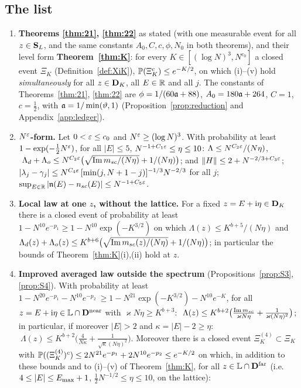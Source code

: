 \subsection{The list}\label{sec:exportlist}
\begin{enumerate}[label=\textbf{(X\arabic*)},leftmargin=3em,itemsep=3pt]
\item \textbf{Theorems \ref{thm:21}, \ref{thm:22}} as stated (with one measurable event for all $z\in\mathbf{S}_L$, and the same constants $A_0,C,c,\phi,N_0$ in both theorems), and their level form \textbf{Theorem~\ref{thm:K}}: for every $K\in[(\log N)^3,N^{c_0}]$ a closed event $\Xi_K$ (Definition~\ref{def:XiK}), $\mathbb{P}(\Xi_K^c)\le e^{-K/2}$, on which (i)--(v) hold \emph{simultaneously} for all $z\in\mathbf{D}_K$, all $E\in\mathbb{R}$ and all $j$.
The constants of Theorems~\ref{thm:21}, \ref{thm:22} are $\phi=1/(60\mathfrak{a}+88)$, $A_0=180\mathfrak{a}+264$, $C=1$, $c=\frac12$, with $\mathfrak{a}=1/\min(\vartheta,1)$ (Proposition~\ref{prop:reduction} and Appendix~\ref{app:ledger}).
\item \textbf{$N^{\varepsilon}$-form.} Let $0<\varepsilon\le c_0$ and $N^\varepsilon\ge(\log N)^3$. With probability at least $1-\exp(-\frac12N^\varepsilon)$, for all $|E|\le5$, $N^{-1+C_1\varepsilon}\le\eta\le10$:
$\Lambda\le N^{C_2\varepsilon}/(N\eta)$, $\ \Lambda_d+\Lambda_o\le N^{C_2\varepsilon}\big(\sqrt{\operatorname{Im}m_{sc}/(N\eta)}+1/(N\eta)\big)$; and $\|H\|\le2+N^{-2/3+C_3\varepsilon}$; $|\lambda_j-\gamma_j|\le N^{C_4\varepsilon}\,[\min(j,N+1-j)]^{-1/3}N^{-2/3}$ for all $j$; $\sup_{E\in\mathbb{R}}|\mathfrak{n}(E)-n_{sc}(E)|\le N^{-1+C_5\varepsilon}$.
\item \textbf{Local law at one $z$, without the lattice.} For a fixed $z=E+\mathrm{i}\eta\in\mathbf{D}_K$ there is a closed event of probability at least $1-N^{10}e^{-p_1}\ge1-N^{10}\exp(-K^{3/2})$ on which
$\Lambda(z)\le K^{b+5}/(N\eta)$ and $\Lambda_d(z)+\Lambda_o(z)\le K^{b+6}\big(\sqrt{\operatorname{Im}m_{sc}(z)/(N\eta)}+1/(N\eta)\big)$; in particular the bounds of Theorem~\ref{thm:K}(i),(ii) hold at $z$.
\item \textbf{Improved averaged law outside the spectrum} (Propositions~\ref{prop:S3}, \ref{prop:S4}). With probability at least $1-N^{20}e^{-p_1}-N^{10}e^{-p_2}\ \ge1-N^{21}\exp(-K^{3/2})-N^{10}e^{-K}$, for all $z=E+\mathrm{i}\eta\in\mathbb L\cap\mathbf{D}^{\rm near}$ with $\varkappa N\eta\ge K^{b+3}$:
$\ \Lambda(z)\le K^{b+2}\big(\frac{\operatorname{Im}m_{sc}}{\varkappa N\eta}+\frac1{\varkappa(N\eta)^2}\big)$; in particular, if moreover $|E|>2$ and $\kappa=|E|-2\ge\eta$: $\ \Lambda(z)\le K^{b+2}\big(\frac4{N\kappa}+\frac1{\sqrt\kappa(N\eta)^2}\big)$.
Moreover there is a closed event $\Xi_K^{(4)}\subset\Xi_K$ with $\mathbb{P}((\Xi_K^{(4)})^c)\le2N^{21}e^{-p_1}+2N^{10}e^{-p_2}\le e^{-K/2}$ on which, in addition to these bounds and to (i)--(v) of Theorem~\ref{thm:K}, for all $z\in\mathbb L\cap\mathbf{D}^{\rm far}$ (i.e.\ $4\le|E|\le E_{\max}+1$, $\frac12N^{-1/2}\le\eta\le10$, on the lattice):

\end{enumerate}
